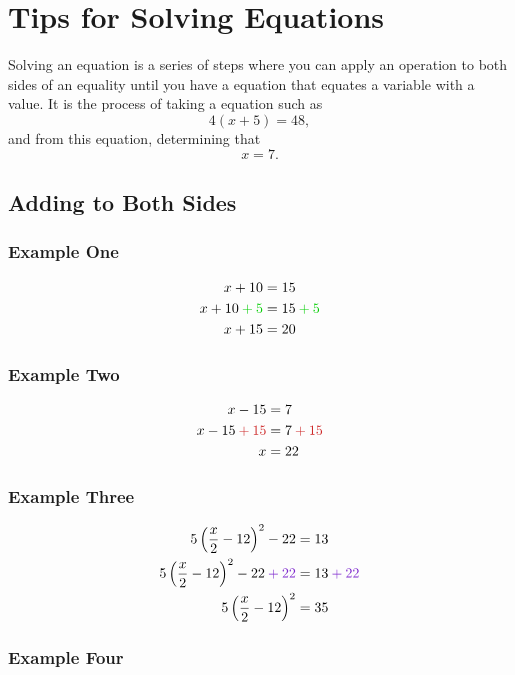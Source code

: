 \documentclass[a4paper,12pt]{article}
\begin{document}
\section*{Tips for Solving Equations}
Solving an equation is a series of steps where you can apply an
operation to both sides of an equality until you have a 
equation that equates a variable with a value. It is the process
of taking a equation such as
$$4(x + 5) = 48,$$
and from this equation, determining that
$$x = 7.$$

\subsection*{Adding to Both Sides}

\subsubsection*{Example One}

\begin{align*}
x + 10  &=  15 \\
x + 10 \color{Green3} + 5\color{black}  &=  15 \color{Green3} + 5 \color{black} \\
x + 15  &=  20
\end{align*}

\subsubsection*{Example Two}

\begin{align*}
x - 15  &=  7 \\
x - 15 \color{Firebrick3} + 15 \color{black}  &=  7 \color{Firebrick3} + 15\color{black} \\
x  &=  22
\end{align*}

\subsubsection*{Example Three}

\begin{align*}
5\left(\frac{x}{2}-12\right)^2 - 22  &=  13 \\
5\left(\frac{x}{2}-12\right)^2 - 22 \color{Purple3} + 22\color{black} &= 13\color{Purple3} + 22\color{black} \\
5\left(\frac{x}{2}-12\right)^2 &= 35
\end{align*}

\subsubsection*{Example Four}
\end{document}
